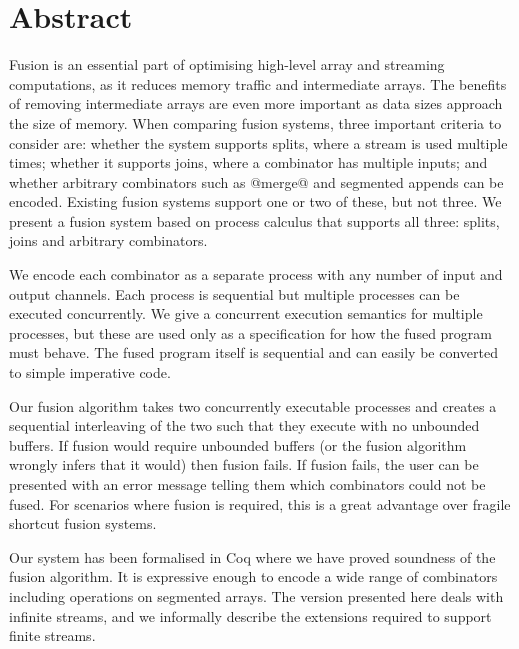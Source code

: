 \chapter*{Abstract}

Fusion is an essential part of optimising high-level array and streaming computations, as it reduces memory traffic and intermediate arrays.
The benefits of removing intermediate arrays are even more important as data sizes approach the size of memory.
When comparing fusion systems, three important criteria to consider are: whether the system supports splits, where a stream is used multiple times; whether it supports joins, where a combinator has multiple inputs; and whether arbitrary combinators such as @merge@ and segmented appends can be encoded.
Existing fusion systems support one or two of these, but not three.
We present a fusion system based on process calculus that supports all three: splits, joins and arbitrary combinators.

We encode each combinator as a separate process with any number of input and output channels.
Each process is sequential but multiple processes can be executed concurrently.
We give a concurrent execution semantics for multiple processes, but these are used only as a specification for how the fused program must behave.
The fused program itself is sequential and can easily be converted to simple imperative code.

Our fusion algorithm takes two concurrently executable processes and creates a sequential interleaving of the two such that they execute with no unbounded buffers.
If fusion would require unbounded buffers (or the fusion algorithm wrongly infers that it would) then fusion fails.
If fusion fails, the user can be presented with an error message telling them which combinators could not be fused.
For scenarios where fusion is required, this is a great advantage over fragile shortcut fusion systems.

Our system has been formalised in Coq where we have proved soundness of the fusion algorithm.
It is expressive enough to encode a wide range of combinators including operations on segmented arrays.
The version presented here deals with infinite streams, and we informally describe the extensions required to support finite streams.
